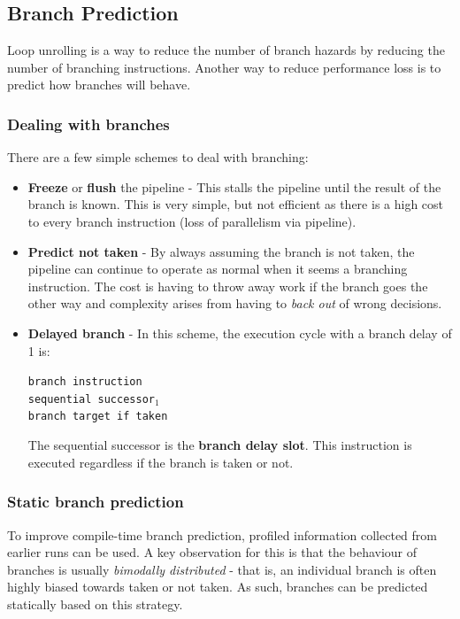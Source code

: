 \documentclass[11pt]{article}
\begin{document}
\subsection{Branch Prediction}
Loop unrolling is a way to reduce the number of branch hazards by reducing the number of branching instructions. Another way to reduce performance loss is to predict how branches will behave. 

\subsubsection{Dealing with branches}
There are a few simple schemes to deal with branching:
\begin{itemize}
\item \textbf{Freeze} or \textbf{flush} the pipeline - This stalls the pipeline until the result of the branch is known. This is very simple, but not efficient as there is a high cost to every branch instruction (loss of parallelism via pipeline). 
\item \textbf{Predict not taken} - By always assuming the branch is not taken, the pipeline can continue to operate as normal when it seems a branching instruction. The cost is having to throw away work if the branch goes the other way and complexity arises from having to \textit{back out} of wrong decisions. 
\item \textbf{Delayed branch} - In this scheme, the execution cycle with a branch delay of 1 is: 
\begin{center}
\texttt{branch instruction}
\\ \texttt{sequential successor${}_{1}$}
\\ \texttt{branch target if taken}
\end{center}
The sequential successor is the \textbf{branch delay slot}. This instruction is executed regardless if the branch is taken or not. 
\end{itemize}

\subsubsection{Static branch prediction}
To improve compile-time branch prediction, profiled information collected from earlier runs can be used. A key observation for this is that the behaviour of branches is usually \textit{bimodally distributed} - that is, an individual branch is often highly biased towards taken or not taken. As such, branches can be predicted statically based on this strategy. 
\end{document}
